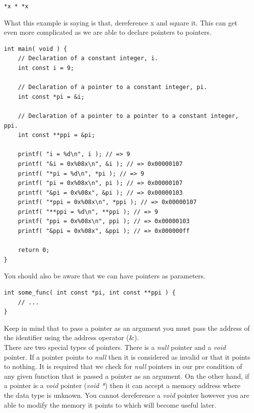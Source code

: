 \documentclass[12pt,extarticle]{article}
\begin{document}
\lstset {
	language=c
}
\begin{lstlisting}
*x * *x
\end{lstlisting}

What this example is saying is that, dereference x and square it. This can get even more complicated as we are able to declare pointers to pointers.\\

\lstset {
	language=c
}
\begin{lstlisting}
int main( void ) {
	// Declaration of a constant integer, i.
	int const i = 9;

	// Declaration of a pointer to a constant integer, pi.
	int const *pi = &i;
	
	// Declaration of a pointer to a pointer to a constant integer, ppi.
	int const **ppi = &pi;

	printf( "i = %d\n", i ); // => 9
	printf( "&i = 0x%08x\n", &i ); // => 0x00000107
	printf( "*pi = %d\n", *pi ); // => 9
	printf( "pi = 0x%08x\n", pi ); // => 0x00000107
	printf( "&pi = 0x%08x", &pi ); // => 0x00000103
	printf( "*ppi = 0x%08x\n", *ppi ); // => 0x00000107
	printf( "**ppi = %d\n", **ppi ); // => 9
	printf( "ppi = 0x%08x\n", ppi ); // => 0x00000103
	printf( "&ppi = 0x%08x", &ppi ); // => 0x000000ff
	
	return 0;
}
\end{lstlisting}

You should also be aware that we can have pointers as parameters.\\

\lstset {
	language=c
}
\begin{lstlisting}
int some_func( int const *pi, int const **ppi ) {
	// ...
}
\end{lstlisting}

Keep in mind that to pass a pointer as an argument you must pass the address of the identifier using the address operator (\&).\\

There are two special types of pointers. There is a \textit{null} pointer and a \textit{void} pointer. If a pointer points to \textit{null} then it is considered as invalid or that it points to nothing. It is required that we check for \textit{null} pointers in our pre condition of any given function that is passed a pointer as an argument. On the other hand, if a pointer is a \textit{void} pointer (\textit{void *}) then it can accept a memory address where the data type is unknown. You cannot dereference a \textit{void} pointer however you are able to modify the memory it points to which will become useful later.\\
\end{document}
